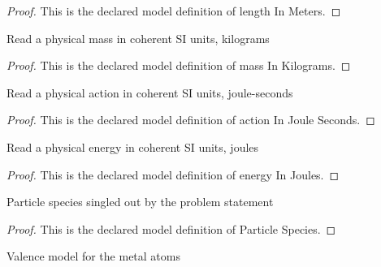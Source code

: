 \begin{proof}
  This is the declared model definition of length In Meters.
\end{proof}
\begin{definition}
  \label{def:physics:phyx-mini-0603:phyxminiproblems-problemphyxmini0603-massinkilograms}
  Read a physical mass in coherent SI units, kilograms
\end{definition}
\begin{proof}
  This is the declared model definition of mass In Kilograms.
\end{proof}
\begin{definition}
  \label{def:physics:phyx-mini-0603:phyxminiproblems-problemphyxmini0603-actioninjouleseconds}
  Read a physical action in coherent SI units, joule-seconds
\end{definition}
\begin{proof}
  This is the declared model definition of action In Joule Seconds.
\end{proof}
\begin{definition}
  \label{def:physics:phyx-mini-0603:phyxminiproblems-problemphyxmini0603-energyinjoules}
  Read a physical energy in coherent SI units, joules
\end{definition}
\begin{proof}
  This is the declared model definition of energy In Joules.
\end{proof}
\begin{definition}
  \label{def:physics:phyx-mini-0603:phyxminiproblems-problemphyxmini0603-particlespecies}
  Particle species singled out by the problem statement
\end{definition}
\begin{proof}
  This is the declared model definition of Particle Species.
\end{proof}
\begin{definition}
  \label{def:physics:phyx-mini-0603:phyxminiproblems-problemphyxmini0603-metalvalencemodel}
  Valence model for the metal atoms
\end{definition}
